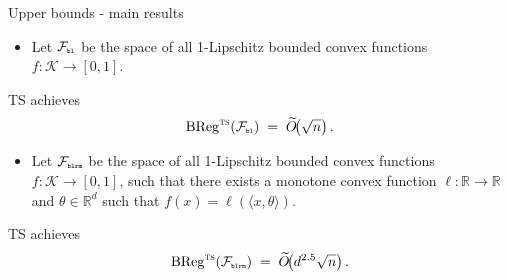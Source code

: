 \documentclass{beamer}
\newcommand{\BReg}{\operatorname{BReg}}
\newcommand{\R}{\mathbb{R}}
\newcommand{\cK}{\mathcal{K}}
\newcommand{\cF}{\mathcal{F}}
\newcommand{\ts}{{\textsc{ts}}}
\newcommand{\pr}{\text{\tiny\texttt{r}}}
\newcommand{\pb}{\text{\tiny\texttt{b}}}
\newcommand{\pl}{\text{\tiny\texttt{l}}}
\renewcommand{\pm}{\text{\tiny\texttt{m}}}
\begin{document}
\begin{frame}{Upper bounds - main results}
    \begin{itemize}
        \item Let $\cF_{\pb\pl}$ be the space of all 1-Lipschitz bounded convex functions $f:\cK \to [0,1]$.
    \end{itemize}
    \smallskip
    \begin{tcolorbox}[title=Theorem 1 -- 1-D convex functions,colback=blue!5!white,colframe=blue!50!black]
        TS achieves
        \[
            \BReg^{\ts}(\cF_{\pb\pl})\;=\; \widetilde{O}\!\bigl(\sqrt{n}\bigr)\,.
        \]
    \end{tcolorbox}
    \smallskip
    \begin{itemize}
        \item Let $\cF_{\pb\pl\pr\pm}$ be the space of all 1-Lipschitz bounded convex functions $f:\cK \to [0,1]$,
              such that there exists a monotone convex function $\ell:\R\to\R$ and $\theta \in \R^d$ such that $f(x) = \ell(\langle x, \theta\rangle)$.
    \end{itemize}
    \begin{tcolorbox}[title=Theorem 2 -- d-D convex ridge functions,colback=blue!5!white,colframe=blue!50!black]
        TS achieves
        \[
            \BReg^{\ts}(\cF_{\pb\pl\pr\pm})\;=\; \widetilde{O}\!\bigl(d^{2.5}\sqrt{n}\bigr)\,.
        \]
    \end{tcolorbox}
\end{frame}

\end{document}
